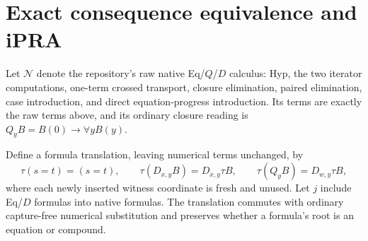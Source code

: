 \documentclass[11pt,letterpaper]{article}
\begin{document}
\section{Exact consequence equivalence and iPRA}
\label{sec:rp-equivalence}

Let $\mathcal N$ denote the repository's raw native Eq/$Q$/$D$ calculus:
Hyp, the two iterator computations, one-term crossed transport, closure
elimination, paired elimination, case introduction, and direct
equation-progress introduction.  Its terms are exactly the raw terms
above, and its ordinary closure reading is
$Q_yB=B(0)\to\forall yB(y)$.

Define a formula translation, leaving numerical terms unchanged, by
\[
 \tau(s=t)=(s=t),\qquad
 \tau(D_{x,y}B)=D_{x,y}\tau B,\qquad
 \tau(Q_yB)=D_{w,y}\tau B,
\]
where each newly inserted witness coordinate is fresh and unused.
Let $j$ include Eq/$D$ formulas into native formulas.  The translation
commutes with ordinary capture-free numerical substitution and preserves
whether a formula's root is an equation or compound.
\end{document}
